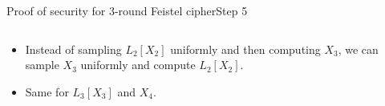 \documentclass[aspectratio=169, lualatex, handout]{beamer}
\begin{document}
\begin{frame}{Proof of security for 3-round Feistel cipher}{Step 5}
	\begin{columns}[c]
		\begin{column}{0.5\textwidth}
			\begin{itemize}[<+->]
				\item Instead of sampling $L_2[X_2]$ uniformly and then computing $X_3$, we can sample $X_3$ uniformly and compute $L_2[X_2]$.
				\item Same for $L_3[X_3]$ and $X_4$.
			\end{itemize}
		\end{column}
		\begin{column}{0.5\textwidth}
			\vspace{-1.5cm}
			\begin{center}
			\end{center}
		\end{column}
	\end{columns}
\end{frame}
\end{document}
